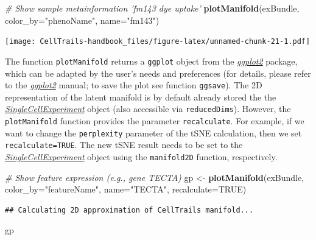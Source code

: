 \documentclass[]{book}
\newenvironment{Shaded}{\begin{snugshade}}{\end{snugshade}}
\newcommand{\KeywordTok}[1]{\textcolor[rgb]{0.13,0.29,0.53}{\textbf{#1}}}
\newcommand{\DataTypeTok}[1]{\textcolor[rgb]{0.13,0.29,0.53}{#1}}
\newcommand{\StringTok}[1]{\textcolor[rgb]{0.31,0.60,0.02}{#1}}
\newcommand{\CommentTok}[1]{\textcolor[rgb]{0.56,0.35,0.01}{\textit{#1}}}
\newcommand{\OtherTok}[1]{\textcolor[rgb]{0.56,0.35,0.01}{#1}}
\newcommand{\NormalTok}[1]{#1}
\theoremstyle{definition}
\theoremstyle{definition}
\theoremstyle{definition}
\theoremstyle{remark}
\begin{document}
\begin{Shaded}
\begin{Highlighting}[]
\CommentTok{# Show sample metainformation 'fm143 dye uptake'}
\KeywordTok{plotManifold}\NormalTok{(exBundle, }\DataTypeTok{color_by=}\StringTok{"phenoName"}\NormalTok{, }\DataTypeTok{name=}\StringTok{"fm143"}\NormalTok{)}
\end{Highlighting}
\end{Shaded}

\texttt{[image: CellTrails-handbook\_files/figure-latex/unnamed-chunk-21-1.pdf]}

The function \texttt{plotManifold} returns a \texttt{ggplot} object
\citep{ggplot2} from the
\emph{\href{https://CRAN.R-project.org/package=ggplot2}{ggplot2}}
package, which can be adapted by the user's needs and preferences (for
details, please refer to the
\emph{\href{https://CRAN.R-project.org/package=ggplot2}{ggplot2}}
manual; to save the plot see function \texttt{ggsave}). The 2D
representation of the latent manifold is by default already stored the
the
\emph{\href{http://bioconductor.org/packages/SingleCellExperiment}{SingleCellExperiment}}
object (also accessible via \texttt{reducedDims}). However, the
\texttt{plotManifold} function provides the parameter
\texttt{recalculate}. For example, if we want to change the
\texttt{perplexity} parameter of the tSNE calculation, then we set
\texttt{recalculate=TRUE}. The new tSNE result needs to be set to the
\emph{\href{http://bioconductor.org/packages/SingleCellExperiment}{SingleCellExperiment}}
object using the \texttt{manifold2D} function, respectively.

\begin{Shaded}
\begin{Highlighting}[]
\CommentTok{# Show feature expression (e.g., gene TECTA)}
\NormalTok{gp <-}\StringTok{ }\KeywordTok{plotManifold}\NormalTok{(exBundle, }\DataTypeTok{color_by=}\StringTok{"featureName"}\NormalTok{, }\DataTypeTok{name=}\StringTok{"TECTA"}\NormalTok{, }\DataTypeTok{recalculate=}\OtherTok{TRUE}\NormalTok{)}
\end{Highlighting}
\end{Shaded}

\begin{verbatim}
## Calculating 2D approximation of CellTrails manifold...
\end{verbatim}

\begin{Shaded}
\begin{Highlighting}[]
\NormalTok{gp}
\end{Highlighting}
\end{Shaded}
\end{document}
